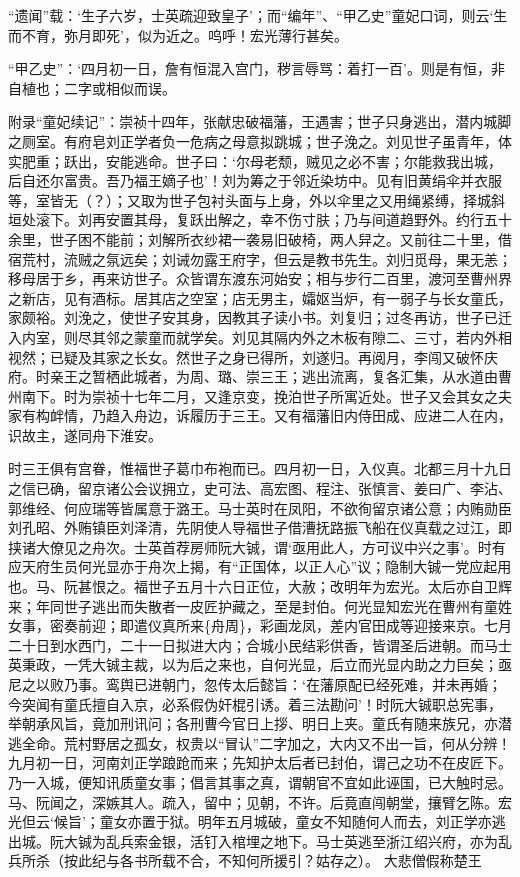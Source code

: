 \documentclass[]{article}
\begin{document}
``遗闻''载：`生子六岁，士英疏迎致皇子'；而``编年''、``甲乙史''童妃口词，则云`生而不育，弥月即死'，似为近之。呜呼！宏光薄行甚矣。

``甲乙史''：`四月初一日，詹有恒混入宫门，秽言辱骂：着打一百'。则是有恒，非自植也；二字或相似而误。

附录``童妃续记''：崇祯十四年，张献忠破福藩，王遇害；世子只身逃出，潜内城脚之厕室。有府皂刘正学者负一危病之母意拟跳城；世子浼之。刘见世子虽青年，体实肥重；跃出，安能逃命。世子曰：`尔母老颓，贼见之必不害；尔能救我出城，后自还尔富贵。吾乃福王嫡子也'！刘为筹之于邻近染坊中。见有旧黄绢伞并衣服等，室皆无（？）；又取为世子包衬头面与上身，外以伞里之又用绳紧缚，择城斜垣处滚下。刘再安置其母，复跃出解之，幸不伤寸肤；乃与间道趋野外。约行五十余里，世子困不能前；刘解所衣纱裙一袭易旧破椅，两人舁之。又前往二十里，借宿荒村，流贼之氛远矣；刘诫勿露王府字，但云是教书先生。刘归觅母，果无恙；移母居于乡，再来访世子。众皆谓东渡东河始安；相与步行二百里，渡河至曹州界之新店，见有酒标。居其店之空室；店无男主，孀妪当炉，有一弱子与长女童氏，家颇裕。刘浼之，使世子安其身，因教其子读小书。刘复归；过冬再访，世子已迁入内室，则尽其邻之蒙童而就学矣。刘见其隔内外之木板有隙二、三寸，若内外相视然；已疑及其家之长女。然世子之身已得所，刘遂归。再阅月，李闯又破怀庆府。时亲王之暂栖此城者，为周、璐、崇三王；逃出流离，复各汇集，从水道由曹州南下。时为崇祯十七年二月，又逢京变，挽泊世子所寓近处。世子又会其女之夫家有构衅情，乃趋入舟边，诉履历于三王。又有福藩旧内侍田成、应进二人在内，识故主，遂同舟下淮安。

时三王俱有宫眷，惟福世子葛巾布袍而已。四月初一日，入仪真。北都三月十九日之信已确，留京诸公会议拥立，史可法、高宏图、程注、张慎言、姜曰广、李沾、郭维经、何应瑞等皆属意于潞王。马士英时在凤阳，不欲徇留京诸公意；内贿勋臣刘孔昭、外贿镇臣刘泽清，先阴使人导福世子借漕抚路振飞船在仪真载之过江，即挟诸大僚见之舟次。士英首荐房师阮大铖，谓`亟用此人，方可议中兴之事'。时有应天府生员何光显亦于舟次上揭，有``正国体，以正人心''议；隐制大铖一党应起用也。马、阮甚恨之。福世子五月十六日正位，大赦；改明年为宏光。太后亦自卫辉来；年同世子逃出而失散者一皮匠护藏之，至是封伯。何光显知宏光在曹州有童姓女事，密奏前迎；即遣仪真所来\{舟周\}，彩画龙凤，差内官田成等迎接来京。七月二十日到水西门，二十一日拟进大内；合城小民结彩供香，皆谓圣后进朝。而马士英秉政，一凭大铖主裁，以为后之来也，自何光显，后立而光显内助之力巨矣；亟尼之以败乃事。鸾舆已进朝门，忽传太后懿旨：`在藩原配已经死难，并未再婚；今突闻有童氏擅自入京，必系假伪奸棍引诱。着三法勘问'！时阮大铖职总宪事，举朝承风旨，竟加刑讯问；各刑曹今官日上拶、明日上夹。童氏有随来族兄，亦潜逃全命。荒村野居之孤女，权贵以``冒认''二字加之，大内又不出一旨，何从分辨！九月初一日，河南刘正学踉跄而来；先知护太后者已封伯，谓己之功不在皮匠下。乃一入城，便知讯质童女事；倡言其事之真，谓朝官不宜如此诬国，已大触时忌。马、阮闻之，深嫉其人。疏入，留中；见朝，不许。后竟直闯朝堂，攘臂乞陈。宏光但云`候旨'；童女亦置于狱。明年五月城破，童女不知随何人而去，刘正学亦逃出城。阮大铖为乱兵索金银，活钉入棺埋之地下。马士英逃至浙江绍兴府，亦为乱兵所杀（按此纪与各书所载不合，不知何所援引？姑存之）。
大悲僧假称楚王
\end{document}
